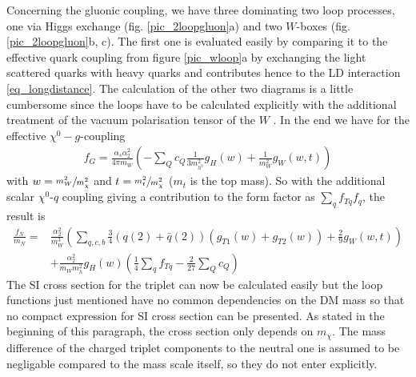 \noindent Concerning the gluonic coupling, we have three dominating two loop processes, one via Higgs exchange (fig. \ref{pic_2loopgluon}a) and two
$W$-boxes (fig. \ref{pic_2loopgluon}b, c). The first one is evaluated easily by comparing it to the effective quark coupling from figure \ref{pic_wloop}a
by exchanging the light scattered quarks with heavy quarks and contributes hence to the LD interaction \eqref{eq_longdistance}. The calculation of 
the other two diagrams is a little cumbersome since the loops have to be calculated explicitly with the additional treatment of the vacuum polarisation
tensor of the $W$ \cite{1007.2601}. In the end we have for the effective $\chi^0-g$-coupling
\begin{align}
 f_G = \frac{\alpha_s\alpha_2^2}{4\pi m_W}\left(-\sum\limits_Q c_Q \frac{1}{3m_{h^0}^2} g_H(w) + \frac{1}{m_W^2} g_{W}(w,t) \right)
\end{align}
with $w=\sfrac{m_W^2}{m_\chi^2}$ and $t=\sfrac{m_t^2}{m_\chi^2}$ ($m_t$ is the top mass).
So with the additional scalar $\chi^0$-$q$ coupling giving a contribution to the form factor as $\sum_qf_{Tq}f_q$, the result is
\begin{align}
 \frac{f_N}{m_N} =& \frac{\alpha_2^2}{m_W^3}\left(\sum\limits_{q,c,b} \frac34 \left(q(2)+\bar q(2)\right) \left(g_{T1}(w) + g_{T2}(w)\right) + \frac29g_W(w,t)\right) \\
 \nonumber
 &+ \frac{\alpha_2^2}{m_W m_h^2}g_H(w) \left(\frac14 \sum\limits_q f_{Tq} - \frac{2}{27}\sum\limits_Q c_Q \right)
\end{align}
The SI cross section for the triplet can now be calculated easily but the loop functions just mentioned have no common dependencies on the DM mass
so that no compact expression for SI cross section can be presented. As stated in the beginning of this paragraph, the cross section only depends
on $m_\chi$. The mass difference of the charged triplet components to the neutral one is assumed to be negligable compared to the mass scale itself,
so they do not enter explicitly. 












